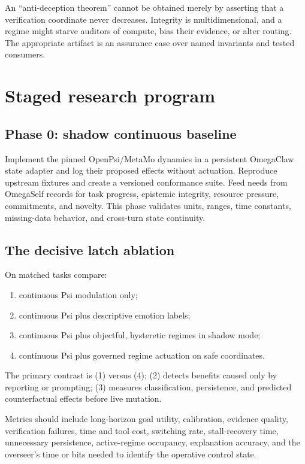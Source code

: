 \documentclass[11pt]{article}
\begin{document}
An ``anti-deception theorem'' cannot be obtained merely by asserting that a
verification coordinate never decreases.  Integrity is multidimensional, and a
regime might starve auditors of compute, bias their evidence, or alter routing.
The appropriate artifact is an assurance case over named invariants and tested
consumers.

\section{Staged research program}

\subsection{Phase 0: shadow continuous baseline}

Implement the pinned OpenPsi/MetaMo dynamics in a persistent OmegaClaw state
adapter and log their proposed effects without actuation.  Reproduce upstream
fixtures and create a versioned conformance suite.  Feed needs from OmegaSelf
records for task progress, epistemic integrity, resource pressure, commitments,
and novelty.  This phase validates units, ranges, time constants, missing-data
behavior, and cross-turn state continuity.

\subsection{The decisive latch ablation}

On matched tasks compare:
\begin{enumerate}[leftmargin=*]
  \item continuous Psi modulation only;
  \item continuous Psi plus descriptive emotion labels;
  \item continuous Psi plus objectful, hysteretic regimes in shadow mode;
  \item continuous Psi plus governed regime actuation on safe coordinates.
\end{enumerate}

The primary contrast is (1) versus (4); (2) detects benefits caused only by
reporting or prompting; (3) measures classification, persistence, and predicted
counterfactual effects before live mutation.

Metrics should include long-horizon goal utility, calibration, evidence quality,
verification failures, time and tool cost, switching rate, stall-recovery time,
unnecessary persistence, active-regime occupancy, explanation accuracy, and the
overseer's time or bits needed to identify the operative control state.
\end{document}
